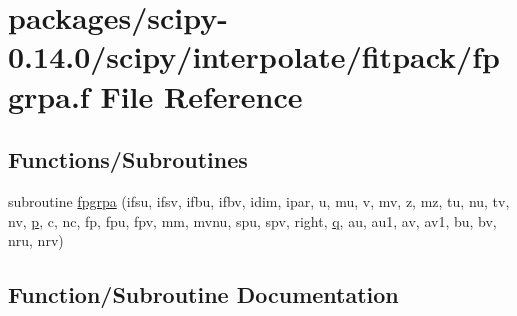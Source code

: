 \hypertarget{fpgrpa_8f}{}\section{packages/scipy-\/0.14.0/scipy/interpolate/fitpack/fpgrpa.f File Reference}
\label{fpgrpa_8f}
\subsection*{Functions/\+Subroutines}
\begin{DoxyCompactItemize}
\item 
subroutine \hyperlink{fpgrpa_8f_a4485c85cdb59b4cb45daa22215855d36}{fpgrpa} (ifsu, ifsv, ifbu, ifbv, idim, ipar, u, mu, v, mv, z, mz, tu, nu, tv, nv, \hyperlink{indexexpr_8h_a2b8c103eb5bfc196fbc3d29923e28ac1}{p}, c, nc, fp, fpu, fpv, mm, mvnu, spu, spv, right, \hyperlink{indexexpr_8h_ac886c3584e464b5533390d7440c9dd98}{q}, au, au1, av, av1, bu, bv, nru, nrv)
\end{DoxyCompactItemize}


\subsection{Function/\+Subroutine Documentation}
\hypertarget{fpgrpa_8f_a4485c85cdb59b4cb45daa22215855d36}{}
